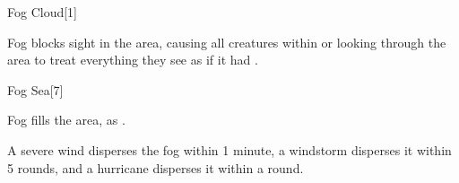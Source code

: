 \begin{spellsection}{Fog Cloud}[1]
    \begin{spellheader}
    \end{spellheader}
    \begin{spellcontent}
        \begin{spelltargetinginfo}
        \end{spelltargetinginfo}
        \begin{spelleffects}
            \spelleffect Fog blocks sight in the area, causing all creatures within or looking through the area to treat everything they see as if it had \concealment.
            \spelldur \durshort
        \end{spelleffects}
    \end{spellcontent}
    \begin{spellfooter}
        \spellnotes \fogspellnotes \fogwindspellnotes

        \physicalspellnotes
        \miscastyou
    \end{spellfooter}
\end{spellsection}

\begin{spellsection}{Fog Sea}[7]
    \begin{spellheader}
    \end{spellheader}
    \begin{spellcontent}
        \begin{spelltargetinginfo}
        \end{spelltargetinginfo}
        \begin{spelleffects}
            \spelleffect Fog fills the area, as .
        \end{spelleffects}
    \end{spellcontent}
    \begin{spellfooter}
        \spellnotes \fogspellnotes A severe wind disperses the fog within 1 minute, a windstorm disperses it within 5 rounds, and a hurricane disperses it within a round.

        \physicalspellnotes
        \miscastexplode
    \end{spellfooter}
\end{spellsection}

